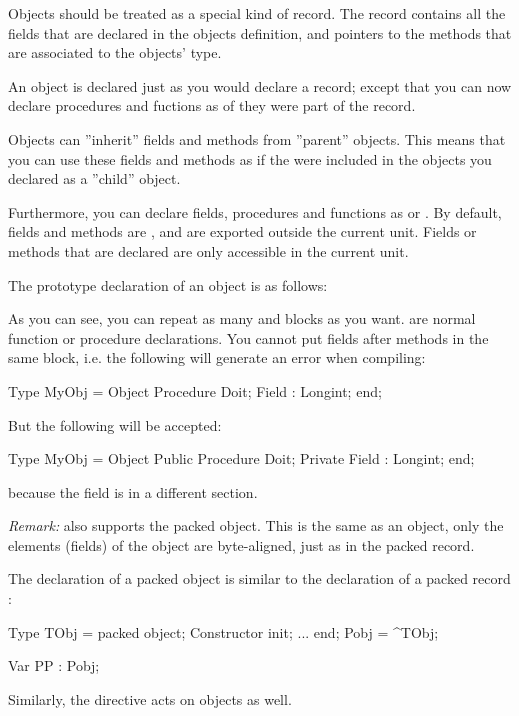 \documentclass{report}
\begin{document}
Objects should be treated as a special kind of record. The record contains 
all the fields that are declared in the objects definition, and pointers 
to the methods that are associated to the objects' type.

An object is declared just as you would declare a record; except that you
can now declare procedures and fuctions as of they were part of the record.

Objects can ''inherit'' fields and methods from ''parent'' objects. This means
that you can use these fields and methods as if the were included in the
objects you declared as a ''child'' object. 

Furthermore, you can declare fields, procedures and functions as 
or . By default, fields and methods are , and are
exported outside the current unit. Fields or methods that are declared
 are only accessible in the current unit.

The prototype declaration of an object is as follows:



As you can see, you can repeat as many  and  
blocks as you want.
 are normal function or procedure declarations. 
You cannot put fields after methods in the same block, i.e. the following 
will generate an error when compiling:
\begin{listing}
Type MyObj = Object
       Procedure Doit;
       Field : Longint;
     end; 
\end{listing}
But the following will be accepted:
\begin{listing}
Type MyObj = Object
      Public
       Procedure Doit;
      Private
       Field : Longint;
     end; 
\end{listing}
because the field is in a different section.

{\em Remark:}
\fpc also supports the packed object. This is the same as an object, only 
the elements (fields) of the object are byte-aligned, just as in the packed
record.

The declaration of a packed object is similar to the declaration
of a packed record :
\begin{listing}
Type
  TObj = packed object;
   Constructor init;
   ...
   end;
  Pobj = ^TObj;

Var PP : Pobj;
\end{listing}  
Similarly, the  directive acts on objects as well.
\end{document}
